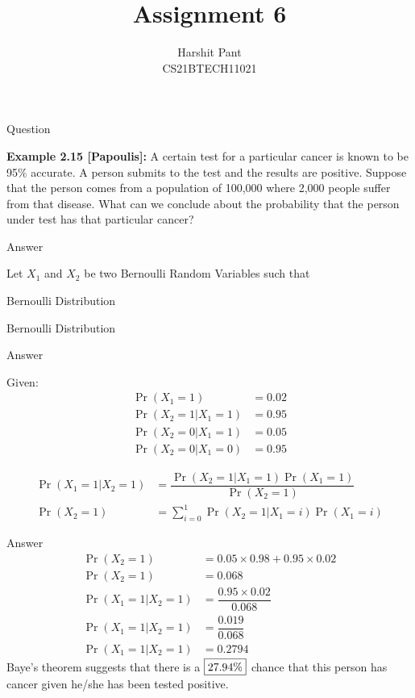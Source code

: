 \documentclass{beamer}
\title{Assignment 6}
\author[CS21BTECH11021]{Harshit Pant\\CS21BTECH11021}
\date{}
\providecommand{\pr}[1]{\ensuremath{\Pr\left(#1\right)}}
\begin{document}
\begin{frame}
    \titlepage 
\end{frame}
\begin{frame}{Question}
\begin{block}{\textbf{Example 2.15 [Papoulis]:}}
 A certain test for a particular cancer is known to be 95$\%$ accurate. A person submits to the test and the results are positive. Suppose that the person comes from a population of 100,000 where 2,000 people suffer from that disease. What can we conclude about the probability that the person under test has that particular cancer?
 \end{block}
\end{frame}
\begin{frame}{Answer}
\begin{exampleblock}{}
Let $X_1$ and $X_2$ be two Bernoulli Random Variables such that
\end{exampleblock}
\begin{table}[H]
\centering

\caption{Bernoulli Distribution}
\label{table:RV1}
\end{table}
\begin{table}[H]
\centering

\caption{Bernoulli Distribution}
\label{table:RV2}
\end{table}
\end{frame}
\begin{frame}{Answer}
\begin{block}{Given:}
\begin{align}
\pr{X_1=1}&=0.02\\
\pr{X_2=1|X_1=1}&=0.95\\
\pr{X_2=0|X_1=1}&=0.05\\
\pr{X_2=0|X_1=0}&=0.95
\end{align}
\end{block}
\begingroup
\addtolength{\jot}{.1in}
\begin{align}
\pr{X_1=1|X_2=1}&=\dfrac{\pr{X_2=1|X_1=1}\pr{X_1=1}}{\pr{X_2=1}}\\
\pr{X_2=1}&=\sum_{i=0}^1 \pr{X_2=1|X_1=i}\pr{X_1=i}
\end{align}
\endgroup
\end{frame}
\begin{frame}{Answer}
\begingroup
\addtolength{\jot}{.1in}
\begin{align}
\pr{X_2=1}&=0.05\times0.98 +0.95\times0.02\\
\pr{X_2=1}&=0.068\\
\pr{X_1=1|X_2=1}&=\dfrac{0.95\times0.02}{0.068}\\
\pr{X_1=1|X_2=1}&=\dfrac{0.019}{0.068}\\
\pr{X_1=1|X_2=1}&=0.2794
\end{align}
\endgroup
Baye's theorem suggests that there is a $\fbox{27.94\%}$ chance that this person has cancer given he/she has been tested positive.
\end{frame}
\end{document}
